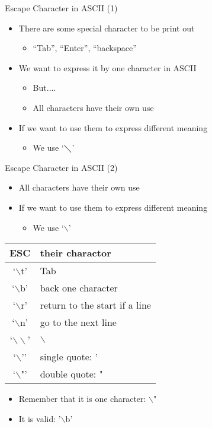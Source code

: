 \begin{frame}{Escape Character in ASCII (1)}
\begin{itemize}
	\item {There are some special character to be print out}
	\begin{itemize}
		\item {``Tab'', ``Enter'', ``backspace''}
	\end{itemize}
	\item {We want to express it by one character in ASCII}
	\begin{itemize}
		\item {But....}
		\item {All characters have their own use}
	\end{itemize}
	\item {If we want to use them to express different meaning}
	\begin{itemize}
		\item {We use `$\diagdown$'}
	\end{itemize}
\end{itemize}
\end{frame}


\begin{frame}{Escape Character in ASCII (2)}
\vspace{-0.1in}
\begin{itemize}
	\item {All characters have their own use}
	\item {If we want to use them to express different meaning}
	\begin{itemize}
		\item {We use `$\backslash$'}
	\end{itemize}
\end{itemize}
\vspace{-0.1in}
\begin{table}
\begin{center}
	\begin{tabular}{|c|l|} \hline
	ESC & their charactor  \\ \hline
	`$\backslash$t' & Tab \\ \hline
	`$\backslash$b' & back one character \\ \hline
	`$\backslash$r' & return to the start if a line\\ \hline
	`$\backslash$n' & go to the next line\\ \hline
	`$\backslash\backslash$' & $\backslash$\\ \hline
	`$\backslash$'' & single quote: '\\ \hline
	`$\backslash$"' & double quote: "\\ \hline
	\end{tabular}
\end{center}
\end{table}
\vspace{-0.1in}
\begin{itemize}
	\item {Remember that it is one character: $\backslash$"}
	\item {It is valid: '$\backslash$b'}
\end{itemize}

\end{frame}


